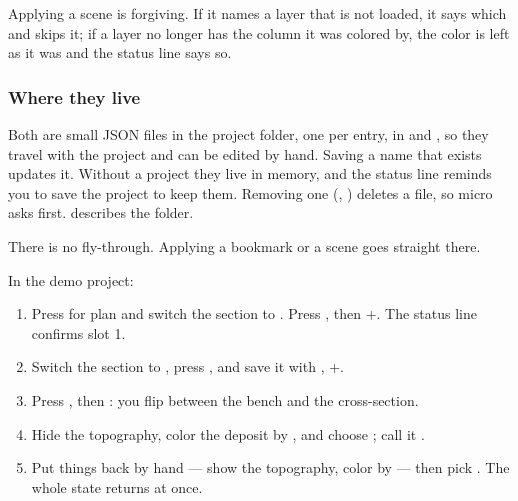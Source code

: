 Applying a scene is forgiving. If it names a layer that is not loaded, it says which and skips it; if a layer no longer has the column it was colored by, the color is left as it was and the status line says so.

\subsubsection{Where they live}
Both are small JSON files in the project folder, one per entry, in  and , so they travel with the project and can be edited by hand. Saving a name that exists updates it. Without a project they live in memory, and the status line reminds you to save the project to keep them. Removing one (, ) deletes a file, so micro asks first.  describes the folder.

There is no fly-through. Applying a bookmark or a scene goes straight there.

\begin{tryit}
In the demo project:
\begin{enumerate}
\item Press  for plan and switch the section to . Press , then +. The status line confirms slot 1.
\item Switch the section to , press , and save it with , +.
\item Press  , then  : you flip between the bench and the cross-section.
\item Hide the topography, color the deposit by , and choose ; call it .
\item Put things back by hand — show the topography, color by  — then pick . The whole state returns at once.
\end{enumerate}
\end{tryit}

